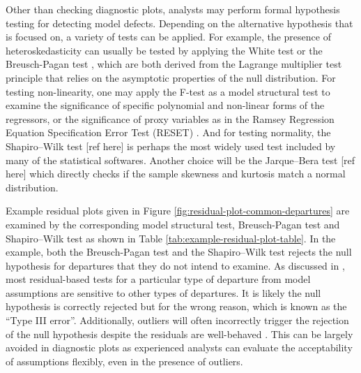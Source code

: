 \documentclass[]{interact}
\theoremstyle{plain}%
\theoremstyle{definition}
\theoremstyle{remark}
\begin{document}
Other than checking diagnostic plots, analysts may perform formal
hypothesis testing for detecting model defects. Depending on the
alternative hypothesis that is focused on, a variety of tests can be
applied. For example, the presence of heteroskedasticity can usually be
tested by applying the White test
\citep{white_heteroskedasticity-consistent_1980} or the Breusch-Pagan
test \citep{breusch_simple_1979}, which are both derived from the
Lagrange multiplier test \citep{silvey1959lagrangian} principle that
relies on the asymptotic properties of the null distribution. For
testing non-linearity, one may apply the F-test as a model structural
test to examine the significance of specific polynomial and non-linear
forms of the regressors, or the significance of proxy variables as in
the Ramsey Regression Equation Specification Error Test (RESET)
\citep{ramsey_tests_1969}. And for testing normality, the Shapiro--Wilk
test {[}ref here{]} is perhaps the most widely used test included by
many of the statistical softwares. Another choice will be the
Jarque--Bera test {[}ref here{]} which directly checks if the sample
skewness and kurtosis match a normal distribution.

Example residual plots given in Figure
\ref{fig:residual-plot-common-departures} are examined by the
corresponding model structural test, Breusch-Pagan test and
Shapiro--Wilk test as shown in Table
\ref{tab:example-residual-plot-table}. In the example, both the
Breusch-Pagan test and the Shapiro--Wilk test rejects the null
hypothesis for departures that they do not intend to examine. As
discussed in \citet{cook1982residuals}, most residual-based tests for a
particular type of departure from model assumptions are sensitive to
other types of departures. It is likely the null hypothesis is correctly
rejected but for the wrong reason, which is known as the ``Type III
error''. Additionally, outliers will often incorrectly trigger the
rejection of the null hypothesis despite the residuals are well-behaved
\citep{cook_applied_1999}. This can be largely avoided in diagnostic
plots as experienced analysts can evaluate the acceptability of
assumptions flexibly, even in the presence of outliers.
\end{document}
